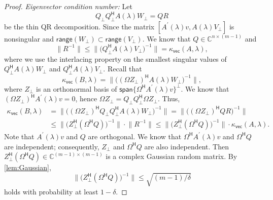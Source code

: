 \documentclass[a4paper,11pt]{article}
\newcommand{\Htran}{\mathsf{H}}
\newcommand{\C}{\mathbb{C}}
\newcommand{\range}{\mathsf{range}}
\newcommand{\kvec}{\kappa_{\mathsf{vec}}}
\providecommand{\spa}[1]{\mathsf{span}\{#1\}}
\providecommand{\norm}[1]{\lVert#1\rVert}
\providecommand{\bignorm}[1]{\bigl\lVert#1\bigr\rVert}
\begin{document}
\begin{proof}
    \emph{Eigenvector condition number:} Let 
    \begin{equation*}
        Q_{\perp}Q_{\perp}^{\Htran}A(\lambda)W_{\perp} = QR
    \end{equation*}
    be the thin QR decomposition. Since the matrix $[A^{\prime}(\lambda)v,A(\lambda)V_{\perp}]$ is nonsingular and $\range(W_{\perp})\subset \range(V_{\perp})$. We know that $Q\in\C^{n\times (m-1)}$ and
    \begin{equation*}
        \norm{R^{-1}} \leq \bignorm{\bigl(Q_{\perp}^{\Htran}A(\lambda)V_{\perp}\bigr)^{-1}} = \kvec(A,\lambda),
    \end{equation*}
    where we use the interlacing property on the smallest singular values of $Q_{\perp}^{\Htran}A(\lambda)W_{\perp}$ and $Q_{\perp}^{\Htran}A(\lambda)V_{\perp}$. 
    Recall that 
    \begin{equation*}
        \kvec(B,\lambda) =  \bignorm{\bigl((\Omega Z_{\perp})^{\Htran}A(\lambda)W_{\perp}\bigr)^{-1}}, 
    \end{equation*}
    where $Z_{\perp}$ is an orthonormal basis of $\spa{\Omega^{\Htran}A^{\prime}(\lambda)v}^{\perp}$. We know that $(\Omega Z_{\perp})^{\Htran}A^{\prime}(\lambda)v=0$, hence $\Omega Z_{\perp} = Q_{\perp}Q_{\perp}^{\Htran}\Omega Z_{\perp}$. Thus, 
    \begin{equation*}
        \begin{aligned}
            \kvec(B,\lambda) &= 
        \bignorm{\bigl((\Omega Z_{\perp})^{\Htran}Q_{\perp}Q_{\perp}^{\Htran}A(\lambda)W_{\perp}\bigr)^{-1}} = \bignorm{\bigl((\Omega Z_{\perp})^{\Htran}QR\bigr)^{-1}} \\ 
        &\leq \bignorm{\bigl(Z_{\perp}^{\Htran}(\Omega^{\Htran}Q)\bigr)^{-1}}\cdot \norm{R^{-1}}\leq \bignorm{\bigl(Z_{\perp}^{\Htran}(\Omega^{\Htran}Q)\bigr)^{-1}}\cdot \kvec(A,\lambda).        
        \end{aligned}
    \end{equation*}
    Note that $A^{\prime}(\lambda)v$ and $Q$ are orthogonal. We know that $\Omega^{\Htran}A^{\prime}(\lambda)v$ and $\Omega^{\Htran}Q$ are independent; consequently, $Z_{\perp}$ and $\Omega^{\Htran}Q$ are also independent. Then $Z_{\perp}^{\Htran}(\Omega^{\Htran}Q)\in\C^{(m-1)\times (m-1)}$ is a complex Gaussian random matrix. By \cref{lem:Gaussian},  
    \begin{equation*}
        \bignorm{\bigl(Z_{\perp}^{\Htran}(\Omega^{\Htran}Q)\bigr)^{-1}}\leq \sqrt{(m-1)/\delta}
    \end{equation*} 
    holds with probability at least $1-\delta$. 
\end{proof}
\end{document}
